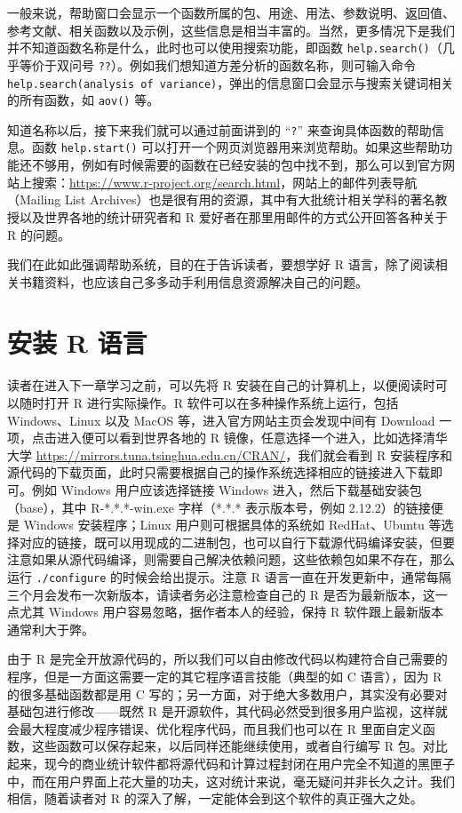 \documentclass[
  b5paper,
  UTF8,twoside]{book}
\begin{document}
一般来说，帮助窗口会显示一个函数所属的包、用途、用法、参数说明、返回值、参考文献、相关函数以及示例，这些信息是相当丰富的。当然，更多情况下是我们并不知道函数名称是什么，此时也可以使用搜索功能，即函数 \texttt{help.search()}（几乎等价于双问号 \texttt{??}）。例如我们想知道方差分析的函数名称，则可输入命令 \texttt{help.search(\textquotesingle{}analysis\ of\ variance\textquotesingle{})}，弹出的信息窗口会显示与搜索关键词相关的所有函数，如 \texttt{aov()} 等。

知道名称以后，接下来我们就可以通过前面讲到的 ``\texttt{?}'' 来查询具体函数的帮助信息。函数 \texttt{help.start()} 可以打开一个网页浏览器用来浏览帮助。如果这些帮助功能还不够用，例如有时候需要的函数在已经安装的包中找不到，那么可以到官方网站上搜索：\url{https://www.r-project.org/search.html}，网站上的邮件列表导航（Mailing List Archives）也是很有用的资源，其中有大批统计相关学科的著名教授以及世界各地的统计研究者和 R 爱好者在那里用邮件的方式公开回答各种关于 R 的问题。

我们在此如此强调帮助系统，目的在于告诉读者，要想学好 R 语言，除了阅读相关书籍资料，也应该自己多多动手利用信息资源解决自己的问题。

\section{安装 R 语言}\label{ux5b89ux88c5-r-ux8bedux8a00}

读者在进入下一章学习之前，可以先将 R 安装在自己的计算机上，以便阅读时可以随时打开 R 进行实际操作。R 软件可以在多种操作系统上运行，包括 Windows、Linux 以及 MacOS 等，进入官方网站主页会发现中间有 Download 一项，点击进入便可以看到世界各地的 R 镜像，任意选择一个进入，比如选择清华大学 \url{https://mirrors.tuna.tsinghua.edu.cn/CRAN/}，我们就会看到 R 安装程序和源代码的下载页面，此时只需要根据自己的操作系统选择相应的链接进入下载即可。例如 Windows 用户应该选择链接 Windows 进入，然后下载基础安装包（base），其中 R-*.*.*-win.exe 字样（*.*.* 表示版本号，例如 2.12.2）的链接便是 Windows 安装程序；Linux 用户则可根据具体的系统如 RedHat、Ubuntu 等选择对应的链接，既可以用现成的二进制包，也可以自行下载源代码编译安装，但要注意如果从源代码编译，则需要自己解决依赖问题，这些依赖包如果不存在，那么运行 \texttt{./configure} 的时候会给出提示。注意 R 语言一直在开发更新中，通常每隔三个月会发布一次新版本，请读者务必注意检查自己的 R 是否为最新版本，这一点尤其 Windows 用户容易忽略，据作者本人的经验，保持 R 软件跟上最新版本通常利大于弊。

由于 R 是完全开放源代码的，所以我们可以自由修改代码以构建符合自己需要的程序，但是一方面这需要一定的其它程序语言技能（典型的如 C 语言），因为 R 的很多基础函数都是用 C 写的；另一方面，对于绝大多数用户，其实没有必要对基础包进行修改------既然 R 是开源软件，其代码必然受到很多用户监视，这样就会最大程度减少程序错误、优化程序代码，而且我们也可以在 R 里面自定义函数，这些函数可以保存起来，以后同样还能继续使用，或者自行编写 R 包。对比起来，现今的商业统计软件都将源代码和计算过程封闭在用户完全不知道的黑匣子中，而在用户界面上花大量的功夫，这对统计来说，毫无疑问并非长久之计。我们相信，随着读者对 R 的深入了解，一定能体会到这个软件的真正强大之处。
\end{document}
